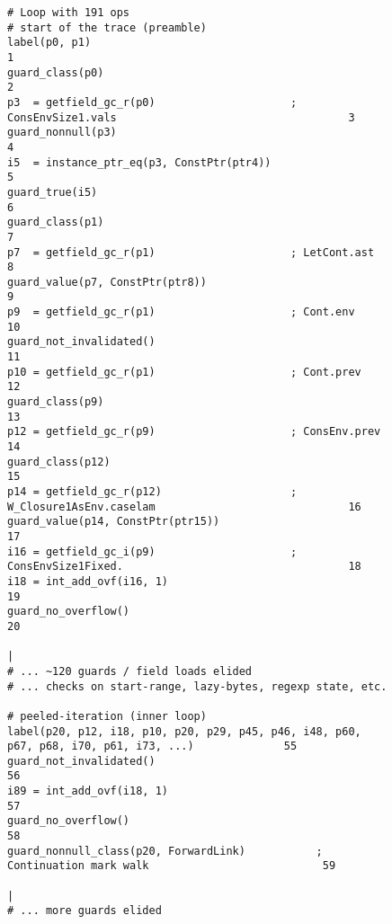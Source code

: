 \begin{figure}[!htbp]
	\centering

	\begin{minipage}{0.92\textwidth}
\begin{lstlisting}[style=rptrace-style]
# Loop with 191 ops
# start of the trace (preamble)
label(p0, p1)                                                                                      1
guard_class(p0)                                                                                    2
p3  = getfield_gc_r(p0)                     ; ConsEnvSize1.vals                                    3
guard_nonnull(p3)                                                                                  4
i5  = instance_ptr_eq(p3, ConstPtr(ptr4))                                                          5
guard_true(i5)                                                                                     6
guard_class(p1)                                                                                    7
p7  = getfield_gc_r(p1)                     ; LetCont.ast                                          8
guard_value(p7, ConstPtr(ptr8))                                                                    9
p9  = getfield_gc_r(p1)                     ; Cont.env                                             10
guard_not_invalidated()                                                                            11
p10 = getfield_gc_r(p1)                     ; Cont.prev                                            12
guard_class(p9)                                                                                    13
p12 = getfield_gc_r(p9)                     ; ConsEnv.prev                                         14
guard_class(p12)                                                                                   15
p14 = getfield_gc_r(p12)                    ; W_Closure1AsEnv.caselam                              16
guard_value(p14, ConstPtr(ptr15))                                                                  17
i16 = getfield_gc_i(p9)                     ; ConsEnvSize1Fixed.                                   18
i18 = int_add_ovf(i16, 1)                                                                          19
guard_no_overflow()                                                                                20
                                                                                                   |
# ... ~120 guards / field loads elided
# ... checks on start-range, lazy-bytes, regexp state, etc.

# peeled-iteration (inner loop)
label(p20, p12, i18, p10, p20, p29, p45, p46, i48, p60, p67, p68, i70, p61, i73, ...)              55
guard_not_invalidated()                                                                            56
i89 = int_add_ovf(i18, 1)                                                                          57
guard_no_overflow()                                                                                58
guard_nonnull_class(p20, ForwardLink)           ; Continuation mark walk                           59
                                                                                                   |
# ... more guards elided


\end{lstlisting}
\end{minipage}
\end{figure}
